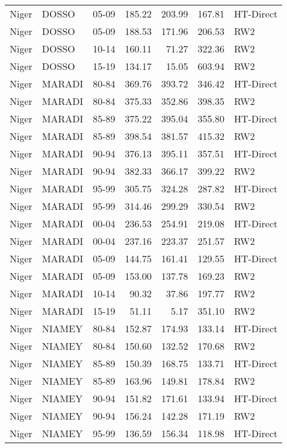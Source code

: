 \begin{longtable}{lllrrrl}
  Niger & DOSSO & 05-09 & 185.22 & 203.99 & 167.81 & HT-Direct \\ 
  Niger & DOSSO & 05-09 & 188.53 & 171.96 & 206.53 & RW2 \\ 
  Niger & DOSSO & 10-14 & 160.11 & 71.27 & 322.36 & RW2 \\ 
  Niger & DOSSO & 15-19 & 134.17 & 15.05 & 603.94 & RW2 \\ 
  Niger & MARADI & 80-84 & 369.76 & 393.72 & 346.42 & HT-Direct \\ 
  Niger & MARADI & 80-84 & 375.33 & 352.86 & 398.35 & RW2 \\ 
  Niger & MARADI & 85-89 & 375.22 & 395.04 & 355.80 & HT-Direct \\ 
  Niger & MARADI & 85-89 & 398.54 & 381.57 & 415.32 & RW2 \\ 
  Niger & MARADI & 90-94 & 376.13 & 395.11 & 357.51 & HT-Direct \\ 
  Niger & MARADI & 90-94 & 382.33 & 366.17 & 399.22 & RW2 \\ 
  Niger & MARADI & 95-99 & 305.75 & 324.28 & 287.82 & HT-Direct \\ 
  Niger & MARADI & 95-99 & 314.46 & 299.29 & 330.54 & RW2 \\ 
  Niger & MARADI & 00-04 & 236.53 & 254.91 & 219.08 & HT-Direct \\ 
  Niger & MARADI & 00-04 & 237.16 & 223.37 & 251.57 & RW2 \\ 
  Niger & MARADI & 05-09 & 144.75 & 161.41 & 129.55 & HT-Direct \\ 
  Niger & MARADI & 05-09 & 153.00 & 137.78 & 169.23 & RW2 \\ 
  Niger & MARADI & 10-14 & 90.32 & 37.86 & 197.77 & RW2 \\ 
  Niger & MARADI & 15-19 & 51.11 & 5.17 & 351.10 & RW2 \\ 
  Niger & NIAMEY & 80-84 & 152.87 & 174.93 & 133.14 & HT-Direct \\ 
  Niger & NIAMEY & 80-84 & 150.60 & 132.52 & 170.68 & RW2 \\ 
  Niger & NIAMEY & 85-89 & 150.39 & 168.75 & 133.71 & HT-Direct \\ 
  Niger & NIAMEY & 85-89 & 163.96 & 149.81 & 178.84 & RW2 \\ 
  Niger & NIAMEY & 90-94 & 151.82 & 171.61 & 133.94 & HT-Direct \\ 
  Niger & NIAMEY & 90-94 & 156.24 & 142.28 & 171.19 & RW2 \\ 
  Niger & NIAMEY & 95-99 & 136.59 & 156.34 & 118.98 & HT-Direct \\ 

\end{longtable}
